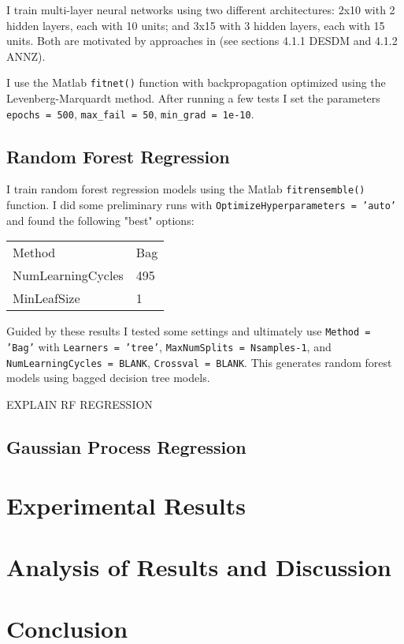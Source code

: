 \documentclass[13pt]{amsart}
\begin{document}
    I train multi-layer neural networks using two different architectures: 2x10 with 2 hidden layers, each with 10 units; and 3x15 with 3 hidden layers, each with 15 units. Both are motivated by approaches in \cite{pzreview} (see sections 4.1.1 DESDM and 4.1.2 ANNZ).

    I use the Matlab \texttt{fitnet()} function with backpropagation optimized using the Levenberg-Marquardt method. After running a few tests I set the parameters \texttt{epochs =  500}, \texttt{max\_fail = 50}, \texttt{min\_grad = 1e-10}.




  \subsection{Random Forest Regression}

    I train random forest regression models using the Matlab \texttt{fitrensemble()} function. I did some preliminary runs with \texttt{OptimizeHyperparameters = 'auto'} and found the following "best" options:

      \begin{table}[H]
      \begin{tabular}{ll}
        Method            & Bag \\
        NumLearningCycles & 495 \\
        MinLeafSize       & 1
      \end{tabular}
      \end{table}

      Guided by these results I tested some settings and ultimately use \texttt{Method = 'Bag'} with \texttt{Learners = 'tree'}, \texttt{MaxNumSplits = Nsamples-1}, and \texttt{NumLearningCycles = BLANK}, \texttt{Crossval = BLANK}. This generates random forest models using bagged decision tree models.

      EXPLAIN RF REGRESSION




  \subsection{Gaussian Process Regression}




\section{Experimental Results}




\section{Analysis of Results and Discussion}



\section{Conclusion}





\end{document}

